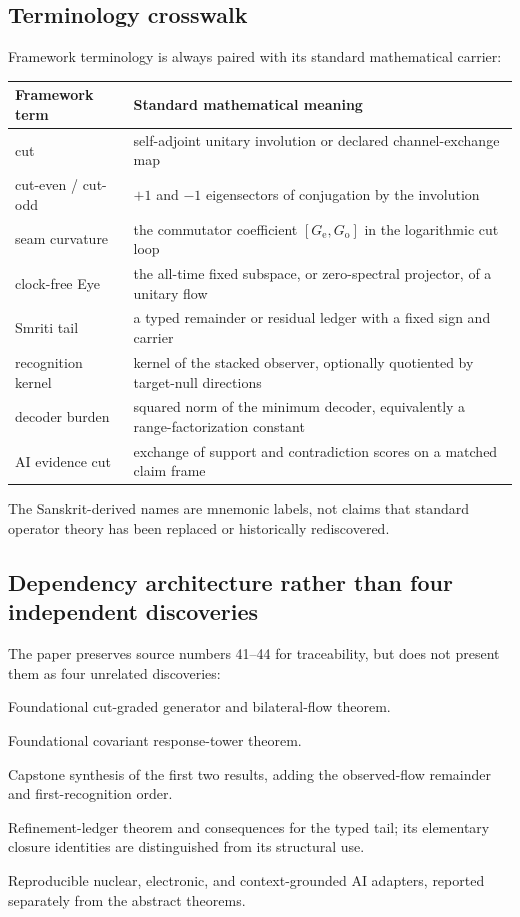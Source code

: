 \subsection{Terminology crosswalk}

Framework terminology is always paired with its standard mathematical carrier:
\begin{center}
\begin{tabular}{p{}p{}}
\toprule
Framework term & Standard mathematical meaning\\
\midrule
cut & self-adjoint unitary involution or declared channel-exchange map\\
cut-even / cut-odd & $+1$ and $-1$ eigensectors of conjugation by the involution\\
seam curvature & the commutator coefficient $[G_{\mathrm e},G_{\mathrm o}]$ in the logarithmic cut loop\\
clock-free Eye & the all-time fixed subspace, or zero-spectral projector, of a unitary flow\\
Smriti tail & a typed remainder or residual ledger with a fixed sign and carrier\\
recognition kernel & kernel of the stacked observer, optionally quotiented by target-null directions\\
decoder burden & squared norm of the minimum decoder, equivalently a range-factorization constant\\
AI evidence cut & exchange of support and contradiction scores on a matched claim frame\\
\bottomrule
\end{tabular}
\end{center}
The Sanskrit-derived names are mnemonic labels, not claims that standard operator theory has been replaced or historically rediscovered.

\subsection{Dependency architecture rather than four independent discoveries}

The paper preserves source numbers 41--44 for traceability, but does not present them as four unrelated discoveries:
\begin{description}[leftmargin=3.8em,style=nextline]
\item[Theorem 41.] Foundational cut-graded generator and bilateral-flow theorem.
\item[Theorem 42.] Foundational covariant response-tower theorem.
\item[Theorem 43.] Capstone synthesis of the first two results, adding the observed-flow remainder and first-recognition order.
\item[Theorem 44.] Refinement-ledger theorem and consequences for the typed tail; its elementary closure identities are distinguished from its structural use.
\item[Finite-data results.] Reproducible nuclear, electronic, and context-grounded AI adapters, reported separately from the abstract theorems.
\end{description}


